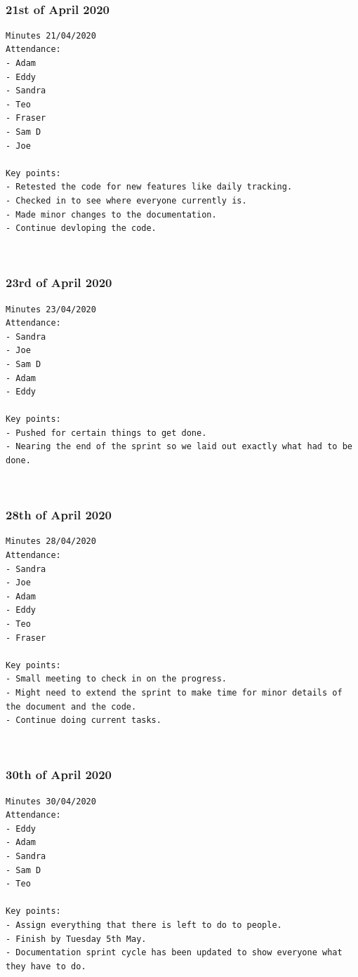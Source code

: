 \documentclass[10pt, notitlepage]{report}
\begin{document}
\leavevmode \\
\subsubsection{21st of  April 2020}

\begin{lstlisting}
Minutes 21/04/2020
Attendance:
- Adam
- Eddy
- Sandra
- Teo
- Fraser
- Sam D
- Joe

Key points:
- Retested the code for new features like daily tracking.
- Checked in to see where everyone currently is.
- Made minor changes to the documentation.
- Continue devloping the code.
\end{lstlisting}

\leavevmode \\
\subsubsection{23rd of April 2020}

\begin{lstlisting}
Minutes 23/04/2020
Attendance:
- Sandra
- Joe
- Sam D
- Adam
- Eddy

Key points:
- Pushed for certain things to get done.
- Nearing the end of the sprint so we laid out exactly what had to be done.
\end{lstlisting}

\leavevmode \\
\subsubsection{28th of April 2020}

\begin{lstlisting}
Minutes 28/04/2020
Attendance:
- Sandra
- Joe
- Adam
- Eddy
- Teo
- Fraser

Key points:
- Small meeting to check in on the progress.
- Might need to extend the sprint to make time for minor details of the document and the code.
- Continue doing current tasks.
\end{lstlisting}

\leavevmode \\
\subsubsection{30th of April 2020}

\begin{lstlisting}
Minutes 30/04/2020
Attendance:
- Eddy
- Adam
- Sandra
- Sam D
- Teo

Key points:
- Assign everything that there is left to do to people.
- Finish by Tuesday 5th May.
- Documentation sprint cycle has been updated to show everyone what they have to do.
\end{lstlisting}
\end{document}
